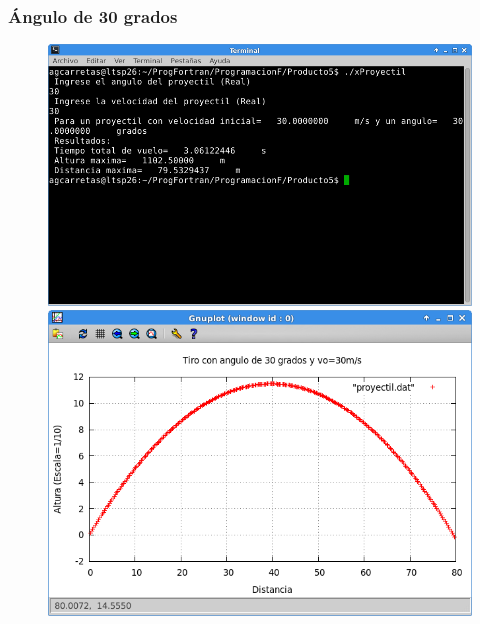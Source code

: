 \documentclass[a4paper]{article}
\begin{document}
\subsubsection{Ángulo de 30 grados}
\begin{figure}[H]
    \centering
    \includegraphics[width=12cm]{30} \\
    \includegraphics[width=12cm]{30plot}
  \end{figure} 
\end{document}
